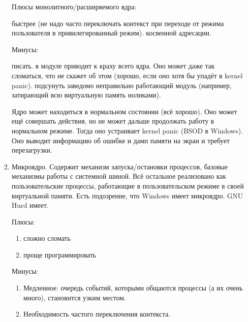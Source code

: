 \documentclass[a4paper,10pt]{article}
\begin{document}
\begin{enumerate}
Плюсы монолитного/расширяемого ядра:
\begin{enumerate}
 быстрее (не надо часто переключать контекст при переходе от режима пользователя в привилегированный режим).
 косвенной адресации.
\end{enumerate}
Минусы:
\begin{enumerate}
 писать.
 в модуле приводит к краху всего ядра. Оно может даже так сломаться, что не скажет об этом (хорошо, если оно хотя бы упадёт в kernel panic).
 подсунуть заведомо неправильно работающий модуль (например, затирающий всю виртуальную память ноликами).
\end{enumerate}
Ядро может находиться в нормальном состоянии (всё хорошо). Оно может ещё совершать действия, но не может дальше продолжать работу в нормальном режиме. Тогда оно устраивает kernel panic (BSOD в Windows). Оно выводит информацию об ошибке и дамп памяти на экран и требует перезагрузки.
\item Микроядро.
Содержит механизм запуска/остановки процессов, базовые механизмы работы с системной шиной. Всё остальное реализовано как пользовательские процессы, работающие в пользовательском режиме в своей виртуальной памяти.
Есть подозрение, что Windows имеет микроядро. GNU Hurd имеет.

Плюсы:
\begin{enumerate}
\item сложно сломать
\item проще программировать
\end{enumerate}
Минусы:
\begin{enumerate}
\item Медленное: очередь событий, которыми общаются процессы (а их очень много), становится узким местом.
\item Необходимость частого переключения контекста.
\end{enumerate}

\end{enumerate}
\end{document}
